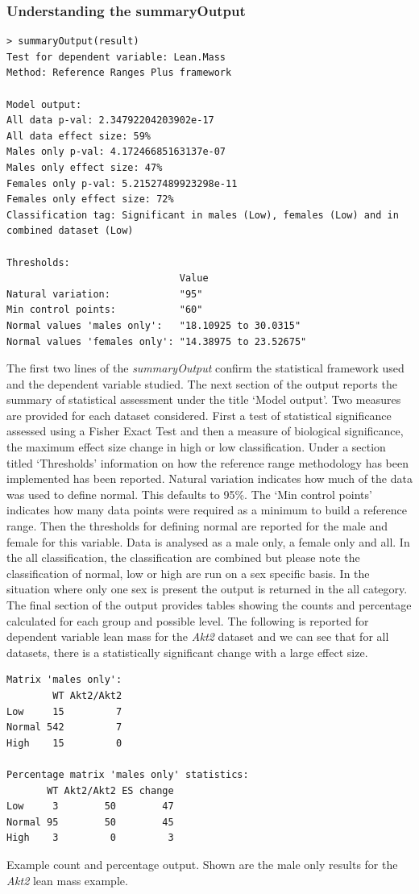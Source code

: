 \documentclass[12pt,a4paper]{article}
\begin{document}
\subsubsection{Understanding the summaryOutput}
\begingroup
    \fontsize{8pt}{12pt}\selectfont
\begin{verbatim}
> summaryOutput(result)
Test for dependent variable: Lean.Mass
Method: Reference Ranges Plus framework

Model output:
All data p-val: 2.34792204203902e-17
All data effect size: 59%
Males only p-val: 4.17246685163137e-07
Males only effect size: 47%
Females only p-val: 5.21527489923298e-11
Females only effect size: 72%
Classification tag: Significant in males (Low), females (Low) and in combined dataset (Low)

Thresholds:
                              Value                 
Natural variation:            "95"                  
Min control points:           "60"                  
Normal values 'males only':   "18.10925 to 30.0315" 
Normal values 'females only': "14.38975 to 23.52675"
\end{verbatim}
\endgroup 
The first two lines of the \textit{summaryOutput} confirm the statistical framework used and the dependent variable studied. The next section of the output reports the summary of statistical assessment under the title ‘Model output’. Two measures are provided for each dataset considered. First a test of statistical significance assessed using a Fisher Exact Test and then a measure of biological significance, the maximum effect size change in high or low classification. Under a section titled ‘Thresholds’ information on how the reference range methodology has been implemented has been reported.  Natural variation indicates how much of the data was used to define normal.  This defaults to 95\%.  The ‘Min control points’ indicates how many data points were required as a minimum to build a reference range.  Then the thresholds for defining normal are reported for the male and female for this variable.  Data is analysed as a male only, a female only and all.  In the all classification, the classification are combined but please note the classification of normal, low or high are run on a sex specific basis.  In the situation where only one sex is present the output is returned in the all category. 
The final section of the output provides tables showing the counts and percentage calculated for each group and possible level. The following is reported for dependent variable lean mass for the \textit{Akt2} dataset and we can see that for all datasets, there is a statistically significant change with a large effect size.
\begingroup
    \fontsize{8pt}{12pt}\selectfont
\begin{verbatim}
Matrix 'males only':
        WT Akt2/Akt2
Low     15         7
Normal 542         7
High    15         0

Percentage matrix 'males only' statistics:
       WT Akt2/Akt2 ES change
Low     3        50        47
Normal 95        50        45
High    3         0         3
\end{verbatim}
\endgroup 
Example count and percentage output.  Shown are the male only results for the \textit{Akt2} lean mass example.
\end{document}

